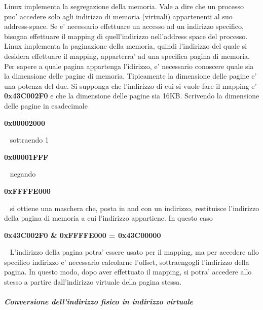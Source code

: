 Linux implementa la segregazione della memoria. Vale a dire che un processo puo' accedere solo agli indirizzo di memoria (virtuali) appartenenti al suo address-\/space. Se e' necessario effettuare un accesso ad un indirizzo specifico, bisogna effettuare il mapping di quell'indirizzo nell'address space del processo. Linux implementa la paginazione della memoria, quindi l'indirizzo del quale si desidera effettuare il mapping, apparterra' ad una specifica pagina di memoria. Per sapere a quale pagina appartenga l'idirizzo, e' necessario conoscere quale sia la dimensione delle pagine di memoria. Tipicamente la dimensione delle pagine e' una potenza del due. Si supponga che l'indirizzo di cui si vuole fare il mapping e' {\bfseries 0x43\+C002\+F0} e che la dimensione delle pagine sia 16\+K\+B. Scrivendo la dimensione delle pagine in esadecimale ~\newline
 \begin{center}{\bfseries 0x00002000}\end{center} ~\newline
 sottraendo 1 ~\newline
 \begin{center}{\bfseries 0x00001\+F\+F\+F}\end{center} ~\newline
 negando ~\newline
 \begin{center}{\bfseries 0x\+F\+F\+F\+F\+E000}\end{center} ~\newline
 si ottiene una maschera che, posta in and con un indirizzo, restituisce l'indirizzo della pagina di memoria a cui l'indirizzo appartiene. In questo caso ~\newline
 \begin{center}{\bfseries 0x43\+C002\+F0 \& 0x\+F\+F\+F\+F\+E000 = 0x43\+C00000}\end{center} ~\newline
 L'indirizzo della pagina potra' essere usato per il mapping, ma per accedere allo specifico indirizzo e' necessario calcolarne l'offset, sottraengogli l'indirizzo della pagina. In questo modo, dopo aver effettuato il mapping, si potra' accedere allo stesso a partire dall'indirizzo virtuale della pagina stessa.

\subparagraph*{Conversione dell'indirizzo fisico in indirizzo virtuale}

